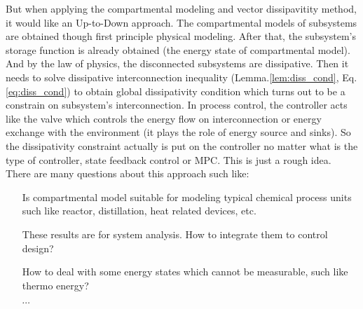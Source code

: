 \documentclass{paper}
\begin{document}
But when applying the compartmental modeling and vector dissipavitity method, it would like an Up-to-Down approach.
The compartmental models of subsystems are obtained though first principle physical modeling. After that, the subsystem's
storage function is already obtained (the energy state of compartmental model). And by the law of physics, the disconnected
subsystems are dissipative. Then it needs to solve dissipative interconnection inequality (Lemma.\ref{lem:diss_cond}, 
Eq.\ref{eq:diss_cond}) to obtain global dissipativity condition which turns out to be a constrain on subsystem's interconnection.
In process control, the controller acts like the valve which controls the energy flow on interconnection or energy exchange
with the environment (it plays the role of energy source and sinks). So the dissipativity constraint actually is put on
the controller no matter what is the type of controller, state feedback control or MPC. This is just a rough idea. There are 
many questions about this approach such like:
\begin{enumerate}
\item[\tb{Q1.}] Is compartmental model suitable for modeling typical chemical process units such like reactor, distillation,
heat related devices, etc.
\item[\tb{Q2.}] These results are for system analysis. How to integrate them to control design?
\item[\tb{Q3.}] How to deal with some energy states which cannot be measurable, such like thermo energy?
\item[$\cdots$] 
\end{enumerate}    


\end{document}
